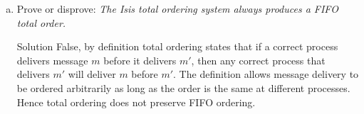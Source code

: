 \documentclass{article}
\begin{document}
\begin{spacing}{1.1}
\begin{homeworkProblem}
\begin{enumerate}[(a)]
			\begin{homeworkSection}{Solution}
			P3:B, P1:B, P2:C, P1:C, P2:A, P3:A
			\end{homeworkSection}
		\item Prove or disprove: \emph{The Isis total ordering system always produces a FIFO total order.}
			\begin{homeworkSection}{Solution}
				False, by definition total ordering states that if a correct process delivers message $m$ before it delivers $m'$, then any correct process that delivers $m'$ will deliver $m$ before $m'$.  The definition allows message delivery to be ordered arbitrarily as long as the order is the same at different processes.  Hence total ordering does not preserve FIFO ordering.  
			\end{homeworkSection}
	\end{enumerate}
\end{homeworkProblem}

\end{spacing}
\end{document}
